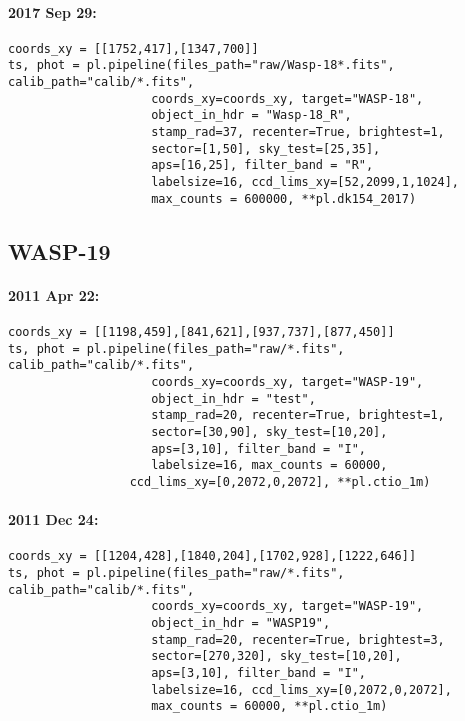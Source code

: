 \paragraph*{2017 Sep 29:}
\begin{verbatim}
coords_xy = [[1752,417],[1347,700]]
ts, phot = pl.pipeline(files_path="raw/Wasp-18*.fits", calib_path="calib/*.fits",
                    coords_xy=coords_xy, target="WASP-18",
                    object_in_hdr = "Wasp-18_R",
                    stamp_rad=37, recenter=True, brightest=1,
                    sector=[1,50], sky_test=[25,35],
                    aps=[16,25], filter_band = "R",
                    labelsize=16, ccd_lims_xy=[52,2099,1,1024],
                    max_counts = 600000, **pl.dk154_2017)
\end{verbatim}


\subsection*{WASP-19}
\paragraph*{2011 Apr 22:}
\begin{verbatim}
coords_xy = [[1198,459],[841,621],[937,737],[877,450]]
ts, phot = pl.pipeline(files_path="raw/*.fits", calib_path="calib/*.fits",
                    coords_xy=coords_xy, target="WASP-19",
                    object_in_hdr = "test",
                    stamp_rad=20, recenter=True, brightest=1,
                    sector=[30,90], sky_test=[10,20],
                    aps=[3,10], filter_band = "I",
                    labelsize=16, max_counts = 60000,
                 ccd_lims_xy=[0,2072,0,2072], **pl.ctio_1m)
\end{verbatim}
\paragraph*{2011 Dec 24:}
\begin{verbatim}
coords_xy = [[1204,428],[1840,204],[1702,928],[1222,646]]
ts, phot = pl.pipeline(files_path="raw/*.fits", calib_path="calib/*.fits",
                    coords_xy=coords_xy, target="WASP-19",
                    object_in_hdr = "WASP19",
                    stamp_rad=20, recenter=True, brightest=3,
                    sector=[270,320], sky_test=[10,20],
                    aps=[3,10], filter_band = "I",
                    labelsize=16, ccd_lims_xy=[0,2072,0,2072],
                    max_counts = 60000, **pl.ctio_1m)
\end{verbatim}
